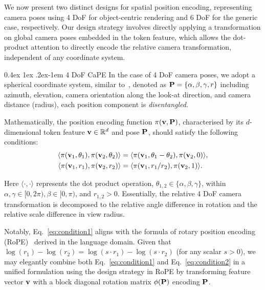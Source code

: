 \documentclass[10pt,twocolumn,letterpaper]{article}
\makeatletter
\renewcommand{\paragraph}{%
  \@startsection{paragraph}{4}%
  {\z@}{0.4ex \@plus 1ex \@minus .2ex}{-1em}%
  {\normalfont\normalsize\bfseries}%
}
\makeatother
\begin{document}
We now present two distinct designs for spatial position encoding, representing camera poses using 4 DoF for object-centric rendering and 6 DoF for the generic case, respectively. Our design strategy involves directly applying a transformation on global camera poses embedded in the token feature, which allows the dot-product attention to directly encode the relative camera transformation, independent of any coordinate system.

\paragraph{4 DoF CaPE}
In the case of 4 DoF camera poses, we adopt a spherical coordinate system, similar to~\cite{liu2023zero, liu2023syncdreamer}, denoted as ${\bf P}=\{\alpha, \beta, \gamma, r\}$ including azimuth, elevation, camera orientation along the look-at direction, and camera distance (radius), each position component is {\it disentangled}.
 
Mathematically, the position encoding function $\pi ({\bf v,P})$, characterised by its $d$-dimensional token feature ${\bf v}\in \mathbb{R}^d$ and pose ${\bf P}$, should satisfy the following conditions:
\begin{align}
    \left\langle \pi({\bf v}_1, \theta_1), \pi({\bf v}_2, \theta_2) \right\rangle &= \langle \pi({\bf v}_1, \theta_1-\theta_2), \pi({\bf v}_2, 0) \rangle, \label{eq:condition1}\\  
     \left\langle \pi({\bf v}_1, r_1), \pi({\bf v}_2, r_2) \right\rangle &= \langle \pi({\bf v}_1, r_1/r_2), \pi({\bf v}_2, 1) \rangle. \label{eq:condition2}
\end{align}

Here $\langle \cdot,\cdot \rangle$ represents the dot product operation, $\theta_{1,2} \in \{ \alpha, \beta, \gamma\}$, within $\alpha, \gamma \in[0, 2\pi), \beta \in [0, \pi)$, and $r_{1,2} >0$. Essentially, the relative 4 DoF camera transformation is decomposed to the relative angle difference in rotation and the relative scale difference in view radius.

Notably, Eq.~\ref{eq:condition1} aligns with the formula of rotary position encoding (RoPE)~\cite{su2021roformer} derived in the language domain. Given that $\log(r_1) - \log(r_2) = \log(s\cdot r_1) - \log(s \cdot r_2)$ (for any scalar $s>0$),  we may elegantly combine both Eq.~\ref{eq:condition1} and Eq.~\ref{eq:condition2} in a unified formulation using the design strategy in RoPE by transforming feature vector ${\bf v}$ with a block diagonal rotation matrix ${\bf \phi(P)}$ encoding ${\bf P}$.
\end{document}
